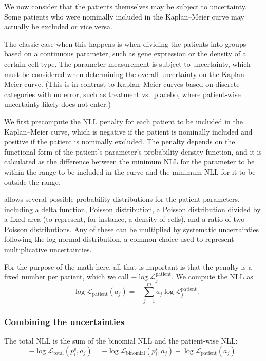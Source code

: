 \documentclass[article]{jss}
\newcommand{\KM}{Kaplan--Meier} %
\begin{document}
We now consider that the patients themselves may be subject to uncertainty. Some patients who were nominally included in the \KM{} curve may actually be excluded or vice versa.

The classic case when this happens is when dividing the patients into groups based on a continuous parameter, such as gene expression or the density of a certain cell type. The parameter measurement is subject to uncertainty, which must be considered when determining the overall uncertainty on the \KM{} curve. (This is in contrast to \KM{} curves based on discrete categories with no error, such as treatment vs.\ placebo, where patient-wise uncertainty likely does not enter.)

We first precompute the NLL penalty for each patient to be included in the \KM{} curve, which is negative if the patient is nominally included and positive if the patient is nominally excluded. The penalty depends on the functional form of the patient's parameter's probability density function, and it is calculated as the difference between the minimum NLL for the parameter to be within the range to be included in the curve and the minimum NLL for it to be outside the range.

 allows several possible probability distributions for the patient parameters, including a delta function, Poisson distribution, a Poisson distribution divided by a fixed area (to represent, for instance, a density of cells), and a ratio of two Poisson distributions. Any of these can be multiplied by systematic uncertainties following the log-normal distribution, a common choice used to represent multiplicative uncertainties.

For the purpose of the math here, all that is important is that the penalty is a fixed number per patient, which we call \(-\log \mathcal{L}_j^{\text{patient}}\). We compute the NLL as
\begin{equation}
-\log \mathcal{L}_{\text{patient}}(a_j) = -\sum_{j=1}^{m} a_j\log \mathcal{L}_j^{\text{patient}}. \label{eq:patient-nll}
\end{equation}

\subsubsection{Combining the uncertainties}\label{sec:combining-uncertainties}

The total NLL is the sum of the binomial NLL and the patient-wise NLL\@:
\begin{equation}
-\log \mathcal{L}_{\text{total}}(p_i^\text{s}, a_j) = -\log \mathcal{L}_{\text{binomial}}(p_i^\text{s}, a_j) - \log \mathcal{L}_{\text{patient}}(a_j). \label{eq:total-nll}
\end{equation}
\end{document}
